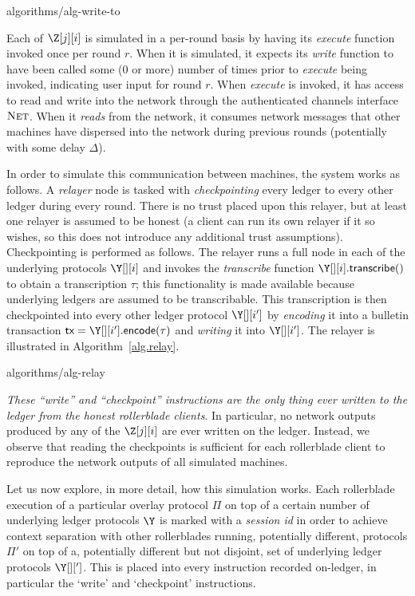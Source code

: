 {algorithms/alg-write-to}

Each of $\Z[j][i]$ is simulated in a per-round basis by having its \emph{execute}
function invoked once per round $r$. When it is simulated, it expects its \emph{write} function to have
been called some ($0$ or more) number of times prior to \emph{execute} being invoked,
indicating user input for round $r$. When \emph{execute} is invoked, it has access to read
and write into the network through the authenticated channels interface $\textsc{Net}$.
When it \emph{reads} from the network, it consumes network messages that other machines
have dispersed into the network during previous rounds (potentially with some delay $\Delta$).

In order to simulate this communication between machines, the system works as follows.
A \emph{relayer} node is tasked with \emph{checkpointing} every ledger to every other ledger
during every round. There is no trust placed upon this relayer, but at least one relayer
is assumed to be honest (a client can run its own relayer if it so wishes, so this does
not introduce any additional trust assumptions). Checkpointing is performed as follows.
The relayer runs a full node in each of the underlying protocols $\Y[][i]$ and
invokes the \emph{transcribe} function $\Y[][i].\transcribe()$ to obtain a transcription
$\tau$; this functionality is made available because underlying ledgers are assumed to be
transcribable. This transcription is then checkpointed into every other ledger protocol
$\Y[][i']$ by \emph{encoding} it into a bulletin transaction $\tx = \Y[][i'].\encode(\tau)$
and \emph{writing} it into $\Y[][i']$. The relayer is illustrated in
Algorithm~\ref{alg.relay}.

{algorithms/alg-relay}

\emph{These ``write'' and ``checkpoint'' instructions are the only thing ever written
to the ledger from the honest rollerblade clients}. In particular, no network outputs
produced by any of the $\Z[j][i]$ are ever written on the ledger. Instead, we observe
that reading the checkpoints is sufficient for each rollerblade client to reproduce
the network outputs of all simulated machines.

Let us now explore, in more detail, how this simulation works. Each rollerblade execution
of a particular overlay protocol $\Pi$ on top of a certain number of underlying ledger
protocols $\Y$ is marked with a \emph{session id} \sid in order to achieve context
separation with other rollerblades running, potentially different, protocols $\Pi'$
on top of a, potentially different but not disjoint, set of underlying ledger protocols
$\Y[][']$. This \sid is placed into every instruction recorded on-ledger, in particular
the `write' and `checkpoint' instructions.

